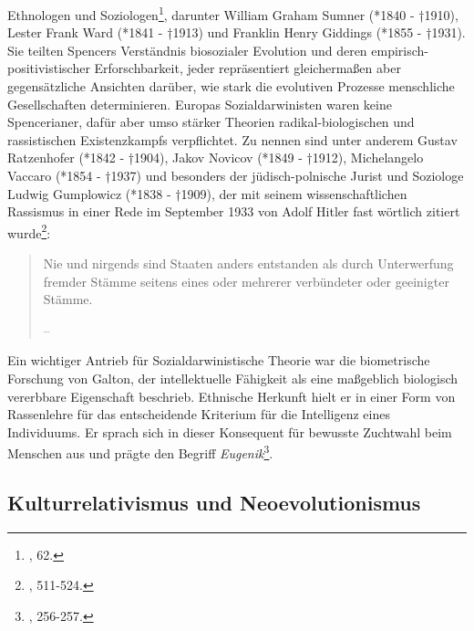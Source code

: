 \documentclass[openany,twoside,twocolumn]{book}
\let\rmarkdownfootnote\footnote%
\def\footnote{\protect\rmarkdownfootnote}
\begin{document}
Ethnologen und Soziologen\footnote{\textcite{smith_cultural_1992}, 62.},
darunter William Graham Sumner (*1840 - †1910), Lester Frank Ward (*1841
- †1913) und Franklin Henry Giddings (*1855 - †1931). Sie teilten
Spencers Verständnis biosozialer Evolution und deren
empirisch-positivistischer Erforschbarkeit, jeder repräsentiert
gleichermaßen aber gegensätzliche Ansichten darüber, wie stark die
evolutiven Prozesse menschliche Gesellschaften determinieren. Europas
Sozialdarwinisten waren keine Spencerianer, dafür aber umso stärker
Theorien radikal-biologischen und rassistischen Existenzkampfs
verpflichtet. Zu nennen sind unter anderem Gustav Ratzenhofer (*1842 -
†1904), Jakov Novicov (*1849 - †1912), Michelangelo Vaccaro (*1854 -
†1937) und besonders der jüdisch-polnische Jurist und Soziologe Ludwig
Gumplowicz (*1838 - †1909), der mit seinem wissenschaftlichen Rassismus
in einer Rede im September 1933 von Adolf Hitler fast wörtlich zitiert
wurde\footnote{\textcite{petermann_geschichte_2004}, 511-524.}:

\begin{quote}
Nie und nirgends sind Staaten anders entstanden als durch Unterwerfung
fremder Stämme seitens eines oder mehrerer verbündeter oder geeinigter
Stämme.

-- \autocite{GumplowiczGrundrissSoziologie1885}
\end{quote}

Ein wichtiger Antrieb für Sozialdarwinistische Theorie war die
biometrische Forschung von Galton, der intellektuelle Fähigkeit als eine
maßgeblich biologisch vererbbare Eigenschaft beschrieb. Ethnische
Herkunft hielt er in einer Form von Rassenlehre für das entscheidende
Kriterium für die Intelligenz eines Individuums. Er sprach sich in
dieser Konsequent für bewusste Zuchtwahl beim Menschen aus und prägte
den Begriff \emph{Eugenik}\footnote{\textcite{bowler_evolution_1989},
  256-257.}.

\hypertarget{kulturrelativismus-und-neoevolutionismus}{%
\subsection{Kulturrelativismus und
Neoevolutionismus}\label{kulturrelativismus-und-neoevolutionismus}}
\end{document}
